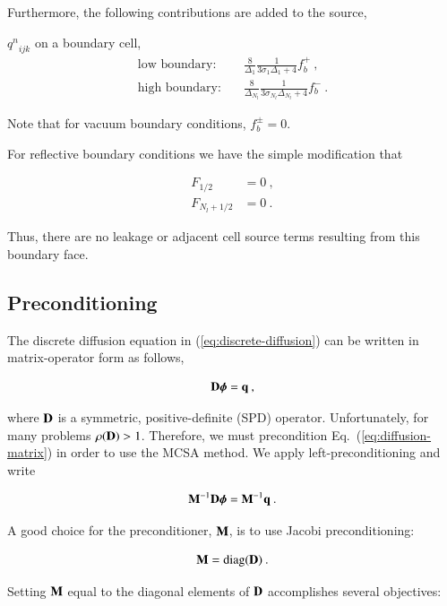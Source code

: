 \documentclass[preprint,12pt]{elsarticle}
\newcommand{\qn}{\ensuremath{q^n}} \newcommand{\Tn}{\ensuremath{T^n}}
\newcommand{\bphi}{\ensuremath{\boldsymbol{\phi}}}
\DeclareMathOperator{\diag}{diag}
\begin{document}
Furthermore, the following contributions are added to the source,

$\qn_{ijk}$ on a boundary cell,
\begin{align}
  \text{low boundary:}\quad & \frac{8}{\Delta_1}
  \frac{1}{3\sigma_1\Delta_1 + 4}f_b^{+}\:,\\ \text{high
    boundary:}\quad & \frac{8}{\Delta_{N_l}}
  \frac{1}{3\sigma_{N_l}\Delta_{N_l} + 4}f_b^{-}\:.
\end{align}

Note that for vacuum boundary conditions, $f_b^{\pm} = 0$.

For reflective boundary conditions we have the simple modification
that

\begin{align}
  F_{1/2} &= 0\:, \\ F_{N_l+1/2} &= 0\:.
\end{align}

Thus, there are no leakage or adjacent cell source terms resulting
from this boundary face.

\subsection{Preconditioning}
\label{sec:preconditioning}

The discrete diffusion equation in (\ref{eq:discrete-diffusion}) can
be written in matrix-operator form as follows,

\begin{equation}
  \ve{D}\bphi = \ve{q}\:,
  \label{eq:diffusion-matrix}
\end{equation}

where $\mathbf{D}$ is a symmetric, positive-definite (SPD) operator.
Unfortunately, for many problems $\rho(\mathbf{D}) > 1$.  Therefore, we
must precondition Eq.~(\ref{eq:diffusion-matrix}) in order to use the
MCSA method. We apply left-preconditioning and write

\begin{equation}
  \ve{M}^{-1}\ve{D}\bphi = \ve{M}^{-1}\ve{q}\:.
  \label{eq:preconditioned-diffusion}
\end{equation}

A good choice for the preconditioner, $\mathbf{M}$, is to use Jacobi
preconditioning:

\begin{equation}
  \ve{M}=\diag(\ve{D})\:.
  \label{eq:preconditioner}
\end{equation}

Setting $\mathbf{M}$ equal to the diagonal elements of $\mathbf{D}$
accomplishes several objectives:
\end{document}
